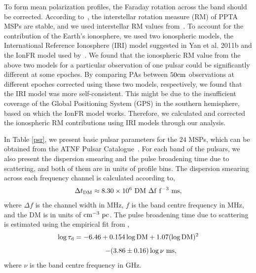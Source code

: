 \documentclass[useAMS,usenatbib]{mn2e}
\begin{document}
To form mean polarization profiles, the Faraday rotation across the band should be 
corrected. 
%
According to~\citet{Yan11b}, the interstellar rotation measure (RM) of PPTA MSPs are 
stable, and we used interstellar RM values from~\citet{Yan11}.
%
To account for the contribution of the Earth's ionosphere, we used two ionospheric 
models, the International Reference Ionosphere (IRI) model suggested in Yan et al. 2011b 
and the IonFR model used by~\citet{Sotomayor13}. 
%
We found that the ionospheric RM value from the above two models for a particular 
observation of one pulsar could be significantly different at some epoches. By 
comparing PAs between $50\rm{cm}$ observations at different epoches corrected using 
these two models, respectively, we found that the IRI model was more self-consistent. 
%
This might be due to the insufficient coverage of the Global Positioning System (GPS) in 
the southern hemisphere, based on which the IonFR model works.
%
Therefore, we calculated and corrected the ionospheric RM contributions using IRI models 
through our analysis.
%

In Table \ref{psr}, we present basic pulsar parameters for the $24$ MSPs, which can be 
obtained from the ATNF Pulsar Catalogue~\citep{Manchester05}.
%
For each band of the pulsars, we also present the dispersion smearing and the pulse 
broadening time due to scattering, and both of them are in units of profile bins.
%
The dispersion smearing across each frequency channel is calculated according to, 
%
\begin{equation}
\Delta t_{\rm{DM}}\approx 8.30 \times 10^{6}\ \rm{DM}\ \Delta f\ f^{-3}\ \rm{ms},
\end{equation}
%
where $\Delta f$ is the channel width in MHz, $f$ is the band centre frequency in MHz, 
and the DM is in units of $\rm{cm^{-3}\ pc}$.
%
The pulse broadening time due to scattering is estimated using the empirical fit 
from \citet{Bhat04}, 
%
\[
\log \tau_{\rm{d}} = -6.46+0.154\log\rm{DM}+1.07(\log\rm{DM})^2
\]
%
\begin{equation}
	\qquad\quad\ \ -(3.86\pm0.16)\log\nu\ \rm{ms},
\end{equation}
where $\nu$ is the band centre frequency in GHz.
%
\end{document}
